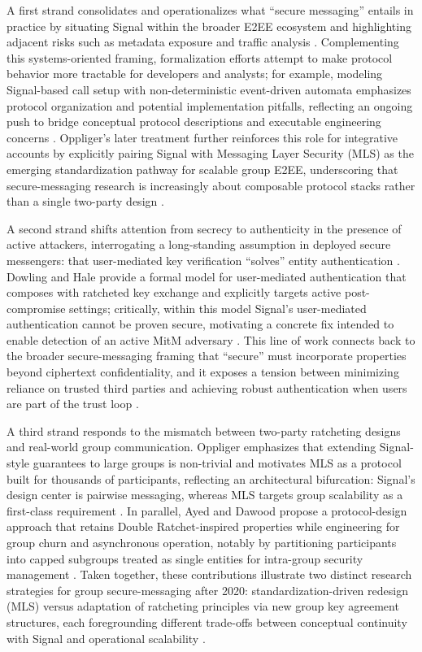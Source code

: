 A first strand consolidates and operationalizes what “secure messaging” entails in practice by situating Signal within the broader E2EE ecosystem and highlighting adjacent risks such as metadata exposure and traffic analysis \cite{oppliger2020}. Complementing this systems-oriented framing, formalization efforts attempt to make protocol behavior more tractable for developers and analysts; for example, modeling Signal-based call setup with non-deterministic event-driven automata emphasizes protocol organization and potential implementation pitfalls, reflecting an ongoing push to bridge conceptual protocol descriptions and executable engineering concerns \cite{vladimirovich2020}. Oppliger’s later treatment further reinforces this role for integrative accounts by explicitly pairing Signal with Messaging Layer Security (MLS) as the emerging standardization pathway for scalable group E2EE, underscoring that secure-messaging research is increasingly about composable protocol stacks rather than a single two-party design \cite{oppliger2024}.

A second strand shifts attention from secrecy to authenticity in the presence of active attackers, interrogating a long-standing assumption in deployed secure messengers: that user-mediated key verification “solves” entity authentication \cite{dowling2021}. Dowling and Hale provide a formal model for user-mediated authentication that composes with ratcheted key exchange and explicitly targets active post-compromise settings; critically, within this model Signal’s user-mediated authentication cannot be proven secure, motivating a concrete fix intended to enable detection of an active MitM adversary \cite{dowling2021}. This line of work connects back to the broader secure-messaging framing that “secure” must incorporate properties beyond ciphertext confidentiality, and it exposes a tension between minimizing reliance on trusted third parties and achieving robust authentication when users are part of the trust loop \cite{oppliger2020,dowling2021}.

A third strand responds to the mismatch between two-party ratcheting designs and real-world group communication. Oppliger emphasizes that extending Signal-style guarantees to large groups is non-trivial and motivates MLS as a protocol built for thousands of participants, reflecting an architectural bifurcation: Signal’s design center is pairwise messaging, whereas MLS targets group scalability as a first-class requirement \cite{oppliger2024}. In parallel, Ayed and Dawood propose a protocol-design approach that retains Double Ratchet-inspired properties while engineering for group churn and asynchronous operation, notably by partitioning participants into capped subgroups treated as single entities for intra-group security management \cite{ayed2025}. Taken together, these contributions illustrate two distinct research strategies for group secure-messaging after 2020: standardization-driven redesign (MLS) versus adaptation of ratcheting principles via new group key agreement structures, each foregrounding different trade-offs between conceptual continuity with Signal and operational scalability \cite{oppliger2024,ayed2025}.

